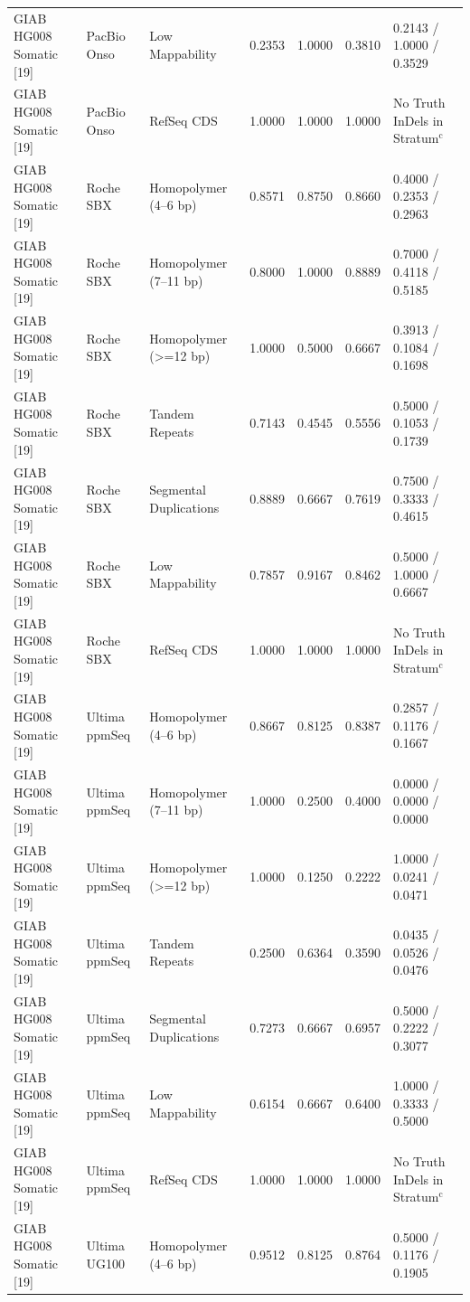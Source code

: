 \begin{table}[htbp]
{\begin{tabular}{lllllll}
GIAB HG008 Somatic [19] & PacBio Onso & Low Mappability & 0.2353 & 1.0000 & 0.3810 & 0.2143 / 1.0000 / 0.3529 \\
GIAB HG008 Somatic [19] & PacBio Onso & RefSeq CDS & 1.0000 & 1.0000 & 1.0000 & No Truth InDels in Stratum$^{\text{c}}$ \\
GIAB HG008 Somatic [19] & Roche SBX & Homopolymer (4--6 bp) & 0.8571 & 0.8750 & 0.8660 & 0.4000 / 0.2353 / 0.2963 \\
GIAB HG008 Somatic [19] & Roche SBX & Homopolymer (7--11 bp) & 0.8000 & 1.0000 & 0.8889 & 0.7000 / 0.4118 / 0.5185 \\
GIAB HG008 Somatic [19] & Roche SBX & Homopolymer (\textgreater{}=12 bp) & 1.0000 & 0.5000 & 0.6667 & 0.3913 / 0.1084 / 0.1698 \\
GIAB HG008 Somatic [19] & Roche SBX & Tandem Repeats & 0.7143 & 0.4545 & 0.5556 & 0.5000 / 0.1053 / 0.1739 \\
GIAB HG008 Somatic [19] & Roche SBX & Segmental Duplications & 0.8889 & 0.6667 & 0.7619 & 0.7500 / 0.3333 / 0.4615 \\
GIAB HG008 Somatic [19] & Roche SBX & Low Mappability & 0.7857 & 0.9167 & 0.8462 & 0.5000 / 1.0000 / 0.6667 \\
GIAB HG008 Somatic [19] & Roche SBX & RefSeq CDS & 1.0000 & 1.0000 & 1.0000 & No Truth InDels in Stratum$^{\text{c}}$ \\
GIAB HG008 Somatic [19] & Ultima ppmSeq & Homopolymer (4--6 bp) & 0.8667 & 0.8125 & 0.8387 & 0.2857 / 0.1176 / 0.1667 \\
GIAB HG008 Somatic [19] & Ultima ppmSeq & Homopolymer (7--11 bp) & 1.0000 & 0.2500 & 0.4000 & 0.0000 / 0.0000 / 0.0000 \\
GIAB HG008 Somatic [19] & Ultima ppmSeq & Homopolymer (\textgreater{}=12 bp) & 1.0000 & 0.1250 & 0.2222 & 1.0000 / 0.0241 / 0.0471 \\
GIAB HG008 Somatic [19] & Ultima ppmSeq & Tandem Repeats & 0.2500 & 0.6364 & 0.3590 & 0.0435 / 0.0526 / 0.0476 \\
GIAB HG008 Somatic [19] & Ultima ppmSeq & Segmental Duplications & 0.7273 & 0.6667 & 0.6957 & 0.5000 / 0.2222 / 0.3077 \\
GIAB HG008 Somatic [19] & Ultima ppmSeq & Low Mappability & 0.6154 & 0.6667 & 0.6400 & 1.0000 / 0.3333 / 0.5000 \\
GIAB HG008 Somatic [19] & Ultima ppmSeq & RefSeq CDS & 1.0000 & 1.0000 & 1.0000 & No Truth InDels in Stratum$^{\text{c}}$ \\
GIAB HG008 Somatic [19] & Ultima UG100 & Homopolymer (4--6 bp) & 0.9512 & 0.8125 & 0.8764 & 0.5000 / 0.1176 / 0.1905 \\

\end{tabular}}
\end{table}
